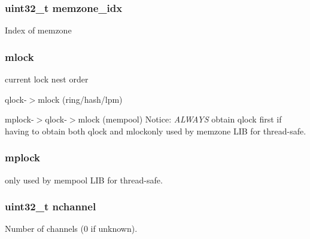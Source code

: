 \subsubsection[{memzone\+\_\+idx}]{\setlength{\rightskip}{0pt plus 5cm}uint32\+\_\+t memzone\+\_\+idx}\label{structrte__mem__config_a678943999c92d21217de78b08a6e9932}
Index of memzone \hypertarget{structrte__mem__config_abe00da43deb96cb01a845ec14091a9c8}{}
\subsubsection[{mlock}]{ mlock}\label{structrte__mem__config_abe00da43deb96cb01a845ec14091a9c8}
current lock nest order
\begin{DoxyItemize}
\item qlock-\/$>$mlock (ring/hash/lpm)
\item mplock-\/$>$qlock-\/$>$mlock (mempool) Notice\+: {\itshape A\+L\+W\+A\+Y\+S} obtain qlock first if having to obtain both qlock and mlockonly used by memzone L\+I\+B for thread-\/safe. 
\end{DoxyItemize}\hypertarget{structrte__mem__config_a73b054303f54aa1245ac1fe315c930ec}{}
\subsubsection[{mplock}]{ mplock}\label{structrte__mem__config_a73b054303f54aa1245ac1fe315c930ec}
only used by mempool L\+I\+B for thread-\/safe. \hypertarget{structrte__mem__config_a5874f4bcabbfe0fd765d5129d629eabf}{}
\subsubsection[{nchannel}]{\setlength{\rightskip}{0pt plus 5cm}uint32\+\_\+t nchannel}\label{structrte__mem__config_a5874f4bcabbfe0fd765d5129d629eabf}
Number of channels (0 if unknown). \hypertarget{structrte__mem__config_a59a112650302067fe308c24133e44d7e}{}
